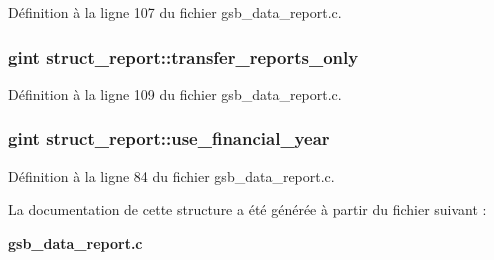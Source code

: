 Définition à la ligne 107 du fichier gsb\_\-data\_\-report.c.

\subsubsection[{transfer\_\-reports\_\-only}]{\setlength{\rightskip}{0pt plus 5cm}gint {\bf struct\_\-report::transfer\_\-reports\_\-only}}\label{structstruct__report_abdfc987a128b8f68d61064998372729d}


Définition à la ligne 109 du fichier gsb\_\-data\_\-report.c.

\subsubsection[{use\_\-financial\_\-year}]{\setlength{\rightskip}{0pt plus 5cm}gint {\bf struct\_\-report::use\_\-financial\_\-year}}\label{structstruct__report_a65f3cde9fe1e0d2a5f7258e8e11018e3}


Définition à la ligne 84 du fichier gsb\_\-data\_\-report.c.



La documentation de cette structure a été générée à partir du fichier suivant :\begin{DoxyCompactItemize}
\item 
{\bf gsb\_\-data\_\-report.c}\end{DoxyCompactItemize}
